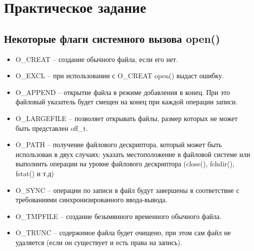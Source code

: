 \chapter{Практическое задание}

\section{Некоторые флаги системного вызова open()}
\begin{itemize}
	\item O\_CREAT -- создание обычного файла, если его нет.
	\item O\_EXCL -- при использовании с O\_CREAT open() выдаст ошибку.
	\item O\_APPEND -- открытие файла в режиме добавления в конец. При это файловый указатель будет смещен на конец при каждой операции записи.
	\item O\_LARGEFILE -- позволяет открывать файлы, размер которых не может быть представлен off\_t.
	\item O\_PATH -- получение файлового дескриптора, который может быть использован в двух случаях: указать местоположение в файловой системе или выполнить операции на уровне файлового дескриптора (close(), fchdir(), fstat() и т.д)
	\item O\_SYNC -- операции по записи в файл будут завершены в соответствие с требованиями синхронизированного ввода-вывода.
	\item O\_TMPFILE -- создание безымянного временного обычного файла.
	\item O\_TRUNC -- содержимое файла будет очищено, при этом сам файл не удаляется (если он существует и есть права на запись).
\end{itemize}

